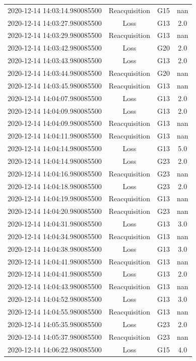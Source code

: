 \begin{enumerate}
\begin{longtabu}{cccc}
2020{-}12{-}14 14:03:14.980085500&Reacquisition&G15&nan\\%
2020{-}12{-}14 14:03:27.980085500&Loss&G13&2.0\\%
2020{-}12{-}14 14:03:29.980085500&Reacquisition&G13&nan\\%
2020{-}12{-}14 14:03:42.980085500&Loss&G20&2.0\\%
2020{-}12{-}14 14:03:43.980085500&Loss&G13&2.0\\%
2020{-}12{-}14 14:03:44.980085500&Reacquisition&G20&nan\\%
2020{-}12{-}14 14:03:45.980085500&Reacquisition&G13&nan\\%
2020{-}12{-}14 14:04:07.980085500&Loss&G13&2.0\\%
2020{-}12{-}14 14:04:09.980085500&Loss&G13&2.0\\%
2020{-}12{-}14 14:04:09.980085500&Reacquisition&G13&nan\\%
2020{-}12{-}14 14:04:11.980085500&Reacquisition&G13&nan\\%
2020{-}12{-}14 14:04:14.980085500&Loss&G13&5.0\\%
2020{-}12{-}14 14:04:14.980085500&Loss&G23&2.0\\%
2020{-}12{-}14 14:04:16.980085500&Reacquisition&G23&nan\\%
2020{-}12{-}14 14:04:18.980085500&Loss&G23&2.0\\%
2020{-}12{-}14 14:04:19.980085500&Reacquisition&G13&nan\\%
2020{-}12{-}14 14:04:20.980085500&Reacquisition&G23&nan\\%
2020{-}12{-}14 14:04:31.980085500&Loss&G13&3.0\\%
2020{-}12{-}14 14:04:34.980085500&Reacquisition&G13&nan\\%
2020{-}12{-}14 14:04:38.980085500&Loss&G13&3.0\\%
2020{-}12{-}14 14:04:41.980085500&Reacquisition&G13&nan\\%
2020{-}12{-}14 14:04:41.980085500&Loss&G13&2.0\\%
2020{-}12{-}14 14:04:43.980085500&Reacquisition&G13&nan\\%
2020{-}12{-}14 14:04:52.980085500&Loss&G13&3.0\\%
2020{-}12{-}14 14:04:55.980085500&Reacquisition&G13&nan\\%
2020{-}12{-}14 14:05:35.980085500&Loss&G23&2.0\\%
2020{-}12{-}14 14:05:37.980085500&Reacquisition&G23&nan\\%
2020{-}12{-}14 14:06:22.980085500&Loss&G15&4.0\\%

\end{longtabu}
\end{enumerate}
